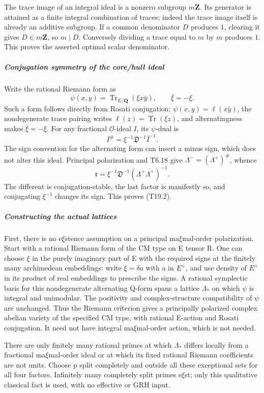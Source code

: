 \documentclass[11pt,a4paper]{article}
\theoremstyle{definition}
\begin{document}
The trace image of an integral ideal is a nonzero subgroup \(m\mathbf Z\). Its generator is attained as a finite integral combination of traces; indeed the trace image itself is already an additive subgroup. If a common denominator \(D\) produces \(1\), clearing it gives \(D\in m\mathbf Z\), so \(m\mid D\). Conversely dividing a trace equal to \(m\) by \(m\) produces \(1\). This proves the asserted optimal scalar denominator.

\subparagraph{Conjugation symmetry of the core/hull ideal}\label{conjugation-symmetry-of-the-corehull-ideal}

Write the rational Riemann form as \[
 \psi(x,y)=\operatorname{Tr}_{E/\mathbf Q}(\xi x\bar y),
 \qquad \bar\xi=-\xi.
 \tag{T19.12}
\] Such a form follows directly from Rosati conjugation: \(\psi(x,y)=\ell(x\bar y)\), the nondegenerate trace pairing writes \(\ell(z)=\operatorname{Tr}(\xi z)\), and alternatingness makes \(\bar\xi=-\xi\). For any fractional \(\mathcal O\)-ideal \(I\), its \(\psi\)-dual is \[
 I^\#=\xi^{-1}\mathfrak D^{-1}\bar I^{-1}.
\] The sign convention for the alternating form can insert a minus sign, which does not alter this ideal. Principal polarization and T6.18 give \(\Lambda^-=(\Lambda^+)^\#\), whence \[
 \mathfrak r
 =\xi^{-1}\mathfrak D^{-1}(\Lambda^+\overline{\Lambda^+})^{-1}.
 \tag{T19.13}
\] The different is conjugation-stable, the last factor is manifestly so, and conjugating \(\xi^{-1}\) changes its sign. This proves (T19.2).

\subparagraph{Constructing the actual lattices}\label{constructing-the-actual-lattices}

First, there is no e\(\xi\)stence assumption on a principal ma\(\xi\)mal-order polarization. Start with a rational Riemann form of the CM type on E tensor R. One can choose \(\xi\) in the purely imaginary part of E with the required signs at the finitely many archimedean embeddings: write \(\xi=\delta a\) with a in \(E^+\), and use density of \(E^+\) in its product of real embeddings to prescribe the signs. A rational symplectic basis for this nondegenerate alternating Q-form spans a lattice \(\Lambda_*\) on which \(\psi\) is integral and unimodular. The positivity and complex-structure compatibility of \(\psi\) are unchanged. Thus the Riemann criterion gives a principally polarized complex abelian variety of the specified CM type, with rational E-action and Rosati conjugation. It need not have integral ma\(\xi\)mal-order action, which is not needed.

There are only finitely many rational primes at which \(\Lambda_*\) differs locally from a fractional ma\(\xi\)mal-order ideal or at which its fixed rational Riemann coefficients are not units. Choose p split completely and outside all these exceptional sets for all four factors. Infinitely many completely split primes e\(\xi\)st; only this qualitative classical fact is used, with no effective or GRH input.
\end{document}
